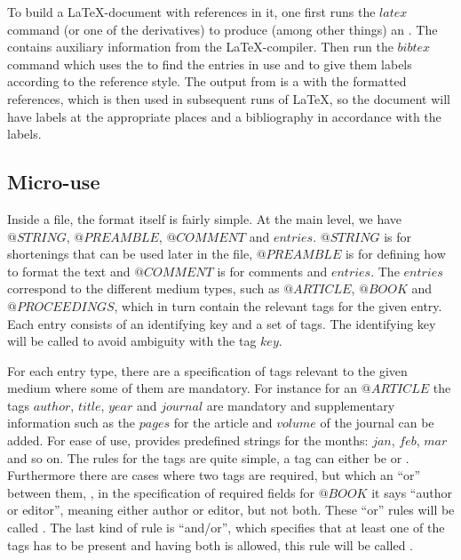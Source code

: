 To build a {\LaTeX}-document with {\bibtex} references in it, one
first runs the $latex$ command (or one of the derivatives) to produce
(among other things) an .  The  contains auxiliary
information from the {\LaTeX}-compiler.  Then run the $bibtex$ command
which uses the  to find the entries in use and to give them
labels according to the reference style.  The output from {\bibtex} is
a  with the formatted references, which is then used in
subsequent runs of {\LaTeX}, so the document will have labels at the
appropriate places and a bibliography in accordance with the labels.


\subsection{Micro-use}
\label{sec:about_micro_use}

Inside a {\bibtex} file, the format itself is fairly simple. At the
main level, we have $@STRING$, $@PREAMBLE$, $@COMMENT$ and $entries$.
$@STRING$ is for shortenings that can be used later in the {\bibtex}
file, $@PREAMBLE$ is for defining how to format the text and
$@COMMENT$ is for comments and $entries$.  The $entries$ correspond to
the different medium types, such as $@ARTICLE$, $@BOOK$ and
$@PROCEEDINGS$, which in turn contain the relevant tags for the given
entry.  Each entry consists of an identifying key and a set of tags.
The identifying key will be called  to avoid
ambiguity with the tag $key$.

For each entry type, there are a specification of tags relevant to the
given medium where some of them are mandatory. For instance for an
$@ARTICLE$ the tags $author$, $title$, $year$ and $journal$ are
mandatory and supplementary information such as the $pages$ for the
article and $volume$ of the journal can be added.  For ease of use,
{\bibtex} provides predefined strings for the months: $jan$, $feb$,
$mar$ and so on.  The rules for the tags are quite simple, a tag can
either be  or .  Furthermore there
are cases where two tags are required, but which an ``or'' between
them, \eg, in the specification of required fields for $@BOOK$ it says
``author or editor'', meaning either author or editor, but not both.
These ``or'' rules will be called .  The last kind
of rule is ``and/or'', which specifies that at least one of the tags
has to be present and having both is allowed, this rule will be called
.

